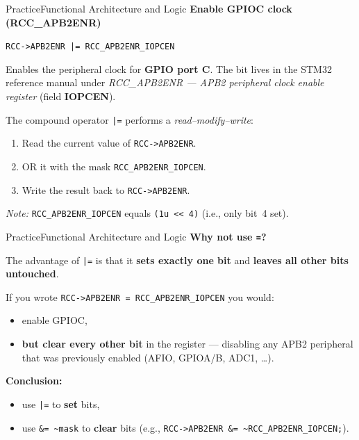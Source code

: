 \documentclass{beamer}
\begin{document}
\begin{frame}{Practice}{Functional Architecture and Logic}
	\textbf{Enable GPIOC clock (RCC\_APB2ENR)}
	\medskip
	
	\texttt{RCC->APB2ENR |= RCC\_APB2ENR\_IOPCEN}
	
	\medskip
	Enables the peripheral clock for \textbf{GPIO port C}. The bit lives in the
	STM32 reference manual under \emph{RCC\_APB2ENR — APB2 peripheral clock enable register}
	(field \textbf{IOPCEN}).
	
	\medskip
	The compound operator \texttt{|=} performs a \emph{read–modify–write}:
	\begin{enumerate}
		\item Read the current value of \texttt{RCC->APB2ENR}.
		\item OR it with the mask \texttt{RCC\_APB2ENR\_IOPCEN}.
		\item Write the result back to \texttt{RCC->APB2ENR}.
	\end{enumerate}
	
	\smallskip
	\textit{Note:} \texttt{RCC\_APB2ENR\_IOPCEN} equals \texttt{(1u << 4)} (i.e., only bit~4 set).
\end{frame}
\begin{frame}{Practice}{Functional Architecture and Logic}
	\textbf{Why not use \texttt{=}?}
	\medskip
	
	The advantage of \texttt{|=} is that it \textbf{sets exactly one bit} and \textbf{leaves all other bits untouched}.
	
	\medskip
	If you wrote \texttt{RCC->APB2ENR = RCC\_APB2ENR\_IOPCEN} you would:
	\begin{itemize}
		\item enable GPIOC,
		\item \textbf{but clear every other bit} in the register — disabling any APB2 peripheral that was previously enabled (AFIO, GPIOA/B, ADC1, \dots).
	\end{itemize}
	
	\medskip
	\textbf{Conclusion:}
	\begin{itemize}
		\item use \texttt{|=} to \textbf{set} bits,
		\item use \texttt{\&= \textasciitilde mask} to \textbf{clear} bits (e.g., \texttt{RCC->APB2ENR \&= \textasciitilde RCC\_APB2ENR\_IOPCEN;}).
	\end{itemize}
\end{frame}
\end{document}
